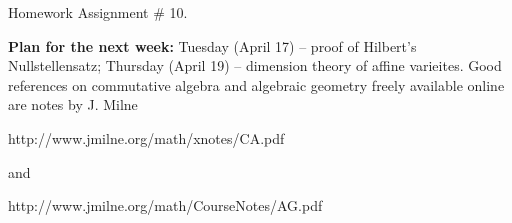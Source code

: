 \documentclass[12pt]{article}
\begin{document}
\baselineskip=15pt
\textheight=9in
\parindent=0pt
\def\sk {\hskip .5cm}
\def\skv {\vskip .07cm}
\def\cos {\mbox{cos}}
\def\sin {\mbox{sin}}
\def\tan {\mbox{tan}}
\def\intl{\int\limits}
\def\lm{\lim\limits}
\newcommand{\frc}{\displaystyle\frac}
\def\xbf{{\mathbf x}}
\def\fbf{{\mathbf f}}
\def\gbf{{\mathbf g}}

\def\Ker{{\rm Ker\,}}
\def\Gal{{\rm Gal\,}}
\def\phi{\varphi}

\def\dbA{{\mathbb A}}
\def\dbB{{\mathbb B}}
\def\dbC{{\mathbb C}}
\def\dbD{{\mathbb D}}
\def\dbE{{\mathbb E}}
\def\dbF{{\mathbb F}}
\def\dbG{{\mathbb G}}
\def\dbH{{\mathbb H}}
\def\dbI{{\mathbb I}}
\def\dbJ{{\mathbb J}}
\def\dbK{{\mathbb K}}
\def\dbL{{\mathbb L}}
\def\dbM{{\mathbb M}}
\def\dbN{{\mathbb N}}
\def\dbO{{\mathbb O}}
\def\dbP{{\mathbb P}}
\def\dbQ{{\mathbb Q}}
\def\dbR{{\mathbb R}}
\def\dbS{{\mathbb S}}
\def\dbT{{\mathbb T}}
\def\dbU{{\mathbb U}}
\def\dbV{{\mathbb V}}
\def\dbW{{\mathbb W}}
\def\dbX{{\mathbb X}}
\def\dbY{{\mathbb Y}}
\def\dbZ{{\mathbb Z}}

\def\Aut{{\rm Aut}}
\def\deg{{\rm deg}}

\def\la{{\langle}}
\def\ra{{\rangle}}

\bf\centerline{Homework Assignment \# 10. }\rm

{\bf Plan for the next week:} Tuesday (April 17) -- proof of Hilbert's Nullstellensatz;
Thursday (April 19) -- dimension theory of affine varieites. Good references on
commutative algebra and algebraic geometry freely available online are notes by 
J. Milne

\centerline{http://www.jmilne.org/math/xnotes/CA.pdf} 

and 

\centerline{http://www.jmilne.org/math/CourseNotes/AG.pdf}
\end{document}
